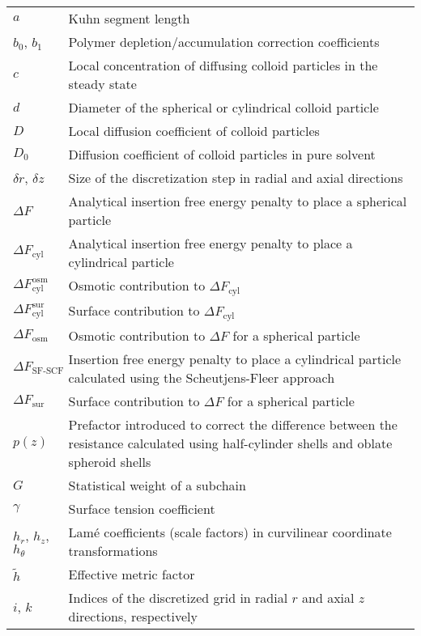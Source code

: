 \documentclass[10pt, a4paper, twocolumn]{article}
\begin{document}
\begin{tabularx}{\linewidth}{l X}
    $a$ & Kuhn segment length \\
    $b_0$, $b_1$ & Polymer depletion/accumulation correction coefficients \\
    $c$ & Local concentration of diffusing colloid particles in the steady state \\
    $d$ & Diameter of the spherical or cylindrical colloid particle \\
    $D$ & Local diffusion coefficient of colloid particles \\
    $D_0$ & Diffusion coefficient of colloid particles in pure solvent \\
    $\delta r$, $\delta z$ & Size of the discretization step in radial and axial directions \\
    $\Delta F$ & Analytical insertion free energy penalty to place a spherical particle \\
    $\Delta F_{\text{cyl}}$ & Analytical insertion free energy penalty to place a cylindrical particle \\
    $\Delta F_{\text{cyl}}^{\text{osm}}$ & Osmotic contribution to $\Delta F_{\text{cyl}}$ \\
    $\Delta F_{\text{cyl}}^{\text{sur}}$ & Surface contribution to $\Delta F_{\text{cyl}}$ \\
    $\Delta F_{\text{osm}}$ & Osmotic contribution to $\Delta F$ for a spherical particle\\
    $\Delta F_{\text{SF-SCF}}$ & Insertion free energy penalty to place a cylindrical particle calculated using the Scheutjens-Fleer approach \\
    $\Delta F_{\text{sur}}$ & Surface contribution to $\Delta F$ for a spherical particle\\
    $p(z)$ & Prefactor introduced to correct the difference between the resistance calculated using half-cylinder shells and oblate spheroid shells \\
    $G$ & Statistical weight of a subchain \\
    $\gamma$ & Surface tension coefficient \\
    $h_{r}$, $h_{z}$, $h_{\theta}$ & Lam\'e coefficients (scale factors) in curvilinear coordinate transformations \\
    $\tilde{h}$ & Effective metric factor \\
    $i$, $k$ & Indices of the discretized grid in radial $r$ and axial $z$ directions, respectively \\

\end{tabularx}
\end{document}
